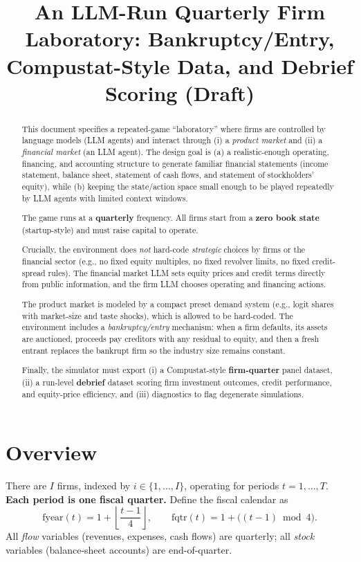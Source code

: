 \documentclass[11pt]{article}
\title{An LLM-Run Quarterly Firm Laboratory: Bankruptcy/Entry, Compustat-Style Data, and Debrief Scoring (Draft)}
\author{}
\date{}
\begin{document}
\maketitle

\begin{abstract}
This document specifies a repeated-game ``laboratory'' where firms are controlled by language models (LLM agents) and interact through (i) a \emph{product market} and (ii) a \emph{financial market} (an LLM agent). The design goal is (a) a realistic-enough operating, financing, and accounting structure to generate familiar financial statements (income statement, balance sheet, statement of cash flows, and statement of stockholders' equity), while (b) keeping the state/action space small enough to be played repeatedly by LLM agents with limited context windows.

The game runs at a \textbf{quarterly} frequency. All firms start from a \textbf{zero book state} (startup-style) and must raise capital to operate.

Crucially, the environment does \emph{not} hard-code \emph{strategic} choices by firms or the financial sector (e.g., no fixed equity multiples, no fixed revolver limits, no fixed credit-spread rules). The financial market LLM sets equity prices and credit terms directly from public information, and the firm LLM chooses operating and financing actions.

The product market is modeled by a compact preset demand system (e.g., logit shares with market-size and taste shocks), which is allowed to be hard-coded. The environment includes a \emph{bankruptcy/entry} mechanism: when a firm defaults, its assets are auctioned, proceeds pay creditors with any residual to equity, and then a fresh entrant replaces the bankrupt firm so the industry size remains constant.

Finally, the simulator must export (i) a Compustat-style \textbf{firm-quarter} panel dataset, (ii) a run-level \textbf{debrief} dataset scoring firm investment outcomes, credit performance, and equity-price efficiency, and (iii) diagnostics to flag degenerate simulations.
\end{abstract}

\section{Overview}

There are $I$ firms, indexed by $i\in\{1,\ldots,I\}$, operating for periods $t=1,\ldots,T$. 
\textbf{Each period is one fiscal quarter.} Define the fiscal calendar as
\[
\text{fyear}(t)=1+\left\lfloor\frac{t-1}{4}\right\rfloor,\qquad 
\text{fqtr}(t)=1+\big((t-1)\bmod 4\big).
\]
All \emph{flow} variables (revenues, expenses, cash flows) are quarterly; all \emph{stock} variables (balance-sheet accounts) are end-of-quarter.
\end{document}
